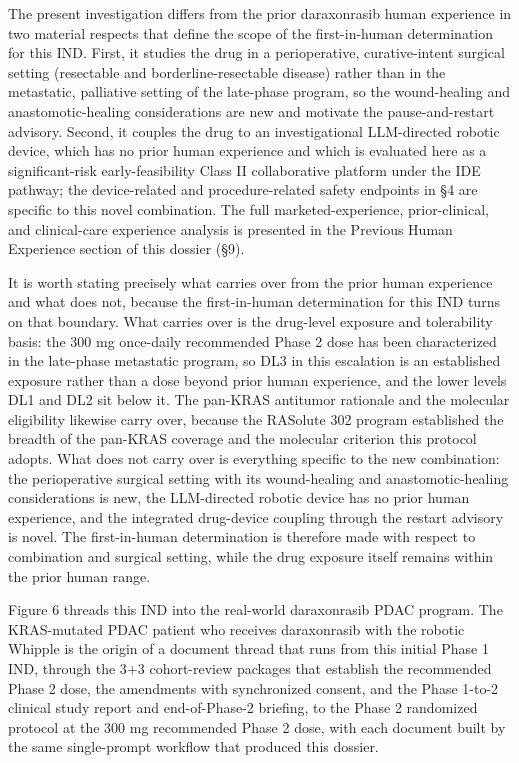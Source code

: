 The present investigation differs from the prior daraxonrasib human experience in
two material respects that define the scope of the first-in-human determination for
this IND. First, it studies the drug in a perioperative, curative-intent surgical
setting (resectable and borderline-resectable disease) rather than in the
metastatic, palliative setting of the late-phase program, so the wound-healing and
anastomotic-healing considerations are new and motivate the pause-and-restart
advisory. Second, it couples the drug to an investigational LLM-directed robotic
device, which has no prior human experience and which is evaluated here as a
significant-risk early-feasibility Class II collaborative platform under the IDE
pathway; the device-related and procedure-related safety endpoints in \S 4 are
specific to this novel combination. The full marketed-experience, prior-clinical,
and clinical-care experience analysis is presented in the Previous Human Experience
section of this dossier (\S 9).

It is worth stating precisely what carries over from the prior human experience and
what does not, because the first-in-human determination for this IND turns on that
boundary. What carries over is the drug-level exposure and tolerability basis: the
300 mg once-daily recommended Phase 2 dose has been characterized in the late-phase
metastatic program, so DL3 in this escalation is an established exposure rather than
a dose beyond prior human experience, and the lower levels DL1 and DL2 sit below it.
The pan-KRAS antitumor rationale and the molecular eligibility likewise carry over,
because the RASolute 302 program established the breadth of the pan-KRAS coverage and
the molecular criterion this protocol adopts. What does not carry over is everything
specific to the new combination: the perioperative surgical setting with its
wound-healing and anastomotic-healing considerations is new, the LLM-directed robotic
device has no prior human experience, and the integrated drug-device coupling through
the restart advisory is novel. The first-in-human determination is therefore made
with respect to combination and surgical setting, while the drug exposure
itself remains within the prior human range.

Figure 6 threads this IND into the real-world daraxonrasib PDAC program. The
KRAS-mutated PDAC patient who receives daraxonrasib with the robotic Whipple is the
origin of a document thread that runs from this initial Phase 1 IND, through the 3+3
cohort-review packages that establish the recommended Phase 2 dose, the amendments
with synchronized consent, and the Phase 1-to-2 clinical study report and
end-of-Phase-2 briefing, to the Phase 2 randomized protocol at the 300 mg
recommended Phase 2 dose, with each document built by the same single-prompt
workflow that produced this dossier.

